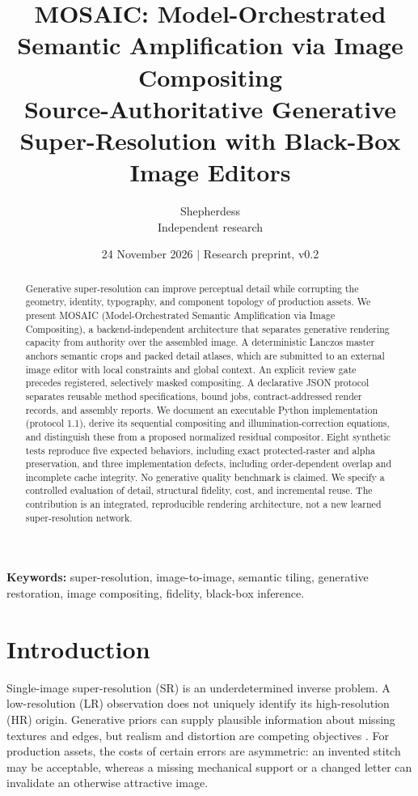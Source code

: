 \documentclass[10pt,twocolumn]{article}
\title{\vspace{-1.2em}\textbf{MOSAIC: Model-Orchestrated Semantic Amplification via Image Compositing}\\[4pt]\large Source-Authoritative Generative Super-Resolution with Black-Box Image Editors}
\author{Shepherdess\\\small Independent research}
\date{24 November 2026 \quad $\vert$ \quad Research preprint, v0.2}
\begin{document}
\maketitle\thispagestyle{fancy}
\begin{abstract}
Generative super-resolution can improve perceptual detail while corrupting the geometry, identity, typography, and component topology of production assets. We present MOSAIC (Model-Orchestrated Semantic Amplification via Image Compositing), a backend-independent architecture that separates generative rendering capacity from authority over the assembled image. A deterministic Lanczos master anchors semantic crops and packed detail atlases, which are submitted to an external image editor with local constraints and global context. An explicit review gate precedes registered, selectively masked compositing. A declarative JSON protocol separates reusable method specifications, bound jobs, contract-addressed render records, and assembly reports. We document an executable Python implementation (protocol 1.1), derive its sequential compositing and illumination-correction equations, and distinguish these from a proposed normalized residual compositor. Eight synthetic tests reproduce five expected behaviors, including exact protected-raster and alpha preservation, and three implementation defects, including order-dependent overlap and incomplete cache integrity. No generative quality benchmark is claimed. We specify a controlled evaluation of detail, structural fidelity, cost, and incremental reuse. The contribution is an integrated, reproducible rendering architecture, not a new learned super-resolution network.
\end{abstract}
\noindent\textbf{Keywords:} super-resolution, image-to-image, semantic tiling, generative restoration, image compositing, fidelity, black-box inference.
\section{Introduction}
Single-image super-resolution (SR) is an underdetermined inverse problem. A low-resolution (LR) observation does not uniquely identify its high-resolution (HR) origin. Generative priors can supply plausible information about missing textures and edges, but realism and distortion are competing objectives \cite{blau}. For production assets, the costs of certain errors are asymmetric: an invented stitch may be acceptable, whereas a missing mechanical support or a changed letter can invalidate an otherwise attractive image.
\end{document}
